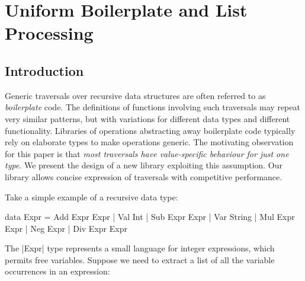 

\chapter{Uniform Boilerplate and List Processing}


\begin{comment}
\begin{code}
class Uniplate x where
	uniplate :: x -> ([x], [x] -> x)
\end{code}
\begin{code}
class Uniplate x where
\end{code}
\begin{code}
transform' x = transform x
\end{code}
\begin{code}
children_ = undefined
context = undefined
\end{code}
\end{comment}





\section{Introduction}

Generic traversals over recursive data structures are often referred to as \textit{boilerplate} code. The definitions of functions involving such traversals may repeat very similar patterns, but with variations for different data types and different functionality. Libraries of operations abstracting away boilerplate code typically rely on elaborate types to make operations generic. The motivating observation for this paper is that \textit{most traversals have value-specific behaviour for just one type}. We present the design of a new library exploiting this assumption. Our library allows concise expression of traversals with competitive performance.

Take a simple example of a recursive data type:

\begin{code}
data Expr  =  Add  Expr  Expr  |  Val  Int
           |  Sub  Expr  Expr  |  Var  String
           |  Mul  Expr  Expr  |  Neg  Expr
           |  Div  Expr  Expr
\end{code}

The |Expr| type represents a small language for integer expressions, which permits free variables. Suppose we need to extract a list of all the variable occurrences in an expression:

